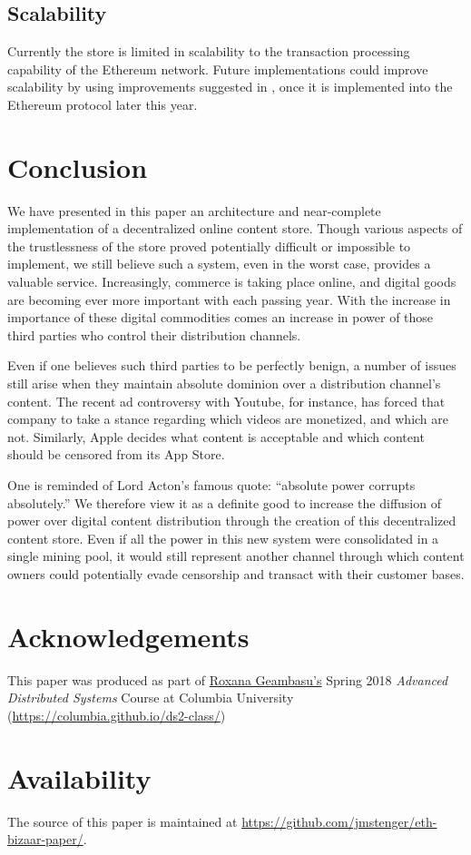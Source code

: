 \documentclass[12pt,oneside]{amsart}
\begin{document}
\begin{multicols}{2}
\subsection{Scalability}

Currently the store is limited in scalability to the transaction processing capability of the Ethereum network.
Future implementations could improve scalability by using improvements suggested in \cite{poon2017plasma}, once it is implemented into the Ethereum protocol later this year.

\section{Conclusion} \label{ch:conclusion}

We have presented in this paper an architecture and near-complete implementation of a decentralized online content store.
Though various aspects of the trustlessness of the store proved potentially difficult or impossible to implement, we still believe such a system, even in the worst case, provides a valuable service.
Increasingly, commerce is taking place online, and digital goods are becoming ever more important with each passing year.
With the increase in importance of these digital commodities comes an increase in power of those third parties who control their distribution channels.

Even if one believes such third parties to be perfectly benign, a number of issues still arise when they maintain absolute dominion over a distribution channel's content.
The recent ad controversy with Youtube, for instance, has forced that company to take a stance regarding which videos are monetized, and which are not.
Similarly, Apple decides what content is acceptable and which content should be censored from its App Store.

One is reminded of Lord Acton's famous quote: ``absolute power corrupts absolutely.''
We therefore view it as a definite good to increase the diffusion of power over digital content distribution through the creation of this decentralized content store.
Even if all the power in this new system were consolidated in a single mining pool, it would still represent another channel through which content owners could potentially evade censorship and transact with their customer bases.

\section{Acknowledgements}

This paper was produced as part of \href{https://roxanageambasu.github.io/}{Roxana Geambasu's} Spring 2018 \textit{Advanced Distributed Systems} Course at Columbia University (\url{https://columbia.github.io/ds2-class/})

\section{Availability}
The source of this paper is maintained at \url{https://github.com/jmstenger/eth-bizaar-paper/}.

\end{multicols}
\end{document}
